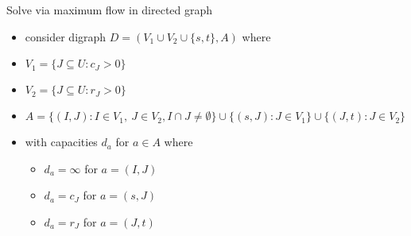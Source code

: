 \documentclass[usenames,dvipsnames]{beamer}
\begin{document}

\begin{frame}{Solve via maximum flow in directed graph}
  \begin{itemize}
  \item consider digraph $D = (V_1 \cup V_2 \cup \{s,t\}, A)$ where
    \item $V_1 = \{J \subseteq U: c_J > 0\}$
    \item $V_2 = \{J \subseteq U: r_J > 0\}$
    \item $A = \{(I,J) : I \in V_1,~J \in V_2, I \cap J \neq
      \emptyset\} \cup \{(s, J) : J \in V_1\} \cup \{(J, t): J \in
      V_2\}$
    \item with capacities $d_a$ for $a \in A$ where
      \begin{itemize}
      \item $d_a = \infty$ for $a = (I,J)$
      \item $d_a = c_J$ for $a = (s,J)$
      \item $d_a = r_J$ for $a = (J,t)$
      \end{itemize}
  \end{itemize}
\end{frame}
\end{document}
